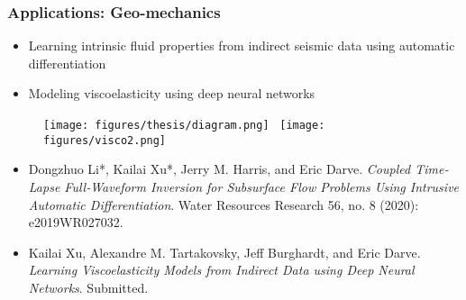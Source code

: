 \documentclass[usenames,dvipsnames]{beamer}
\begin{document}
\begin{frame}
	\frametitle{Applications: Geo-mechanics}
	
	\begin{itemize}
	\item Learning intrinsic fluid properties from indirect seismic data using automatic differentiation
	\item Modeling viscoelasticity using deep neural networks 
	\end{itemize}

	\begin{figure}[hbt]
	\centering 
	\texttt{[image: figures/thesis/diagram.png]}~
	\texttt{[image: figures/visco2.png]}
\end{figure}
	\vspace{-0.2cm}
{
	\tiny
	
	\begin{itemize}
		\item[] Dongzhuo Li*, Kailai Xu*, Jerry M. Harris, and Eric Darve. \textit{Coupled Time‐Lapse Full‐Waveform Inversion for Subsurface Flow Problems Using Intrusive Automatic Differentiation}. Water Resources Research 56, no. 8 (2020): e2019WR027032.
		
		\item[] Kailai Xu, Alexandre M. Tartakovsky, Jeff Burghardt, and Eric Darve. \textit{Learning Viscoelasticity Models from Indirect Data using Deep Neural Networks}. Submitted.
	\end{itemize}
}

\end{frame}
\end{document}
